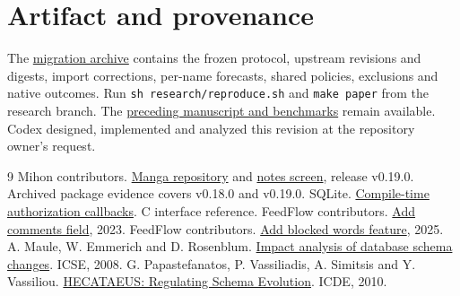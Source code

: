 \documentclass[11pt,a4paper]{article}
\newcommand{\code}[1]{\texttt{#1}}
\newcommand{\archive}{\href{https://github.com/oraoraoraaa/least-privilege-lab/tree/research/classroom-replay/research/migrations}{migration archive}}
\begin{document}
\section*{Artifact and provenance}
The \archive{} contains the frozen protocol, upstream revisions and digests, import corrections, per-name forecasts, shared policies, exclusions and native outcomes. Run \code{sh research/reproduce.sh} and \code{make paper} from the research branch. The \href{https://github.com/oraoraoraaa/least-privilege-lab/tree/4a0eeee2ca8e873ef8c86b7a3c4150513e19f4c5}{preceding manuscript and benchmarks} remain available. Codex designed, implemented and analyzed this revision at the repository owner's request.

\begin{thebibliography}{9}\small\setlength{\itemsep}{2pt}
 Mihon contributors. \href{https://github.com/mihonapp/mihon/blob/e4de208cf75e273b425bf4b1fe4bd7bc3d9cc459/data/src/main/java/tachiyomi/data/manga/MangaRepositoryImpl.kt}{Manga repository} and \href{https://github.com/mihonapp/mihon/blob/e4de208cf75e273b425bf4b1fe4bd7bc3d9cc459/app/src/main/java/eu/kanade/tachiyomi/ui/manga/notes/MangaNotesScreen.kt}{notes screen}, release v0.19.0. Archived package evidence covers v0.18.0 and v0.19.0.
 SQLite. \href{https://sqlite.org/c3ref/set_authorizer.html}{Compile-time authorization callbacks}. C interface reference.
 FeedFlow contributors. \href{https://github.com/prof18/feed-flow/commit/d58c99729f0678196d305f0ec063665cdd62acf8}{Add comments field}, 2023.
 FeedFlow contributors. \href{https://github.com/prof18/feed-flow/commit/0a45953705fbeaaaedeba92fd0fa33473a66d33e}{Add blocked words feature}, 2025.
 A. Maule, W. Emmerich and D. Rosenblum. \href{https://doi.org/10.1145/1368088.1368150}{Impact analysis of database schema changes}. ICSE, 2008.
 G. Papastefanatos, P. Vassiliadis, A. Simitsis and Y. Vassiliou. \href{https://www.cse.uoi.gr/~pvassil/publications/2010_ICDE/ICDE_2010.pdf}{HECATAEUS: Regulating Schema Evolution}. ICDE, 2010.
\end{thebibliography}
\end{document}
